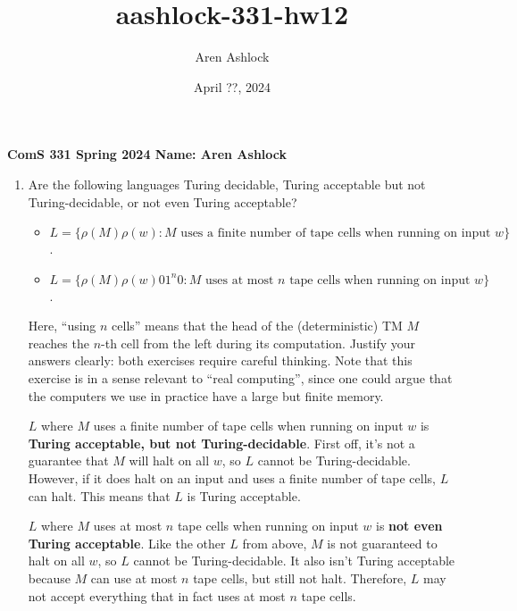 \documentclass[12pt]{article}
\title{aashlock-331-hw12}
\author{Aren Ashlock}
\date{April ??, 2024}
\begin{document}
\noindent\textbf{ComS 331 \quad Spring 2024 \quad Name: Aren Ashlock}

\begin{enumerate}


\item Are the following languages Turing decidable, Turing acceptable but not Turing-decidable, or not even Turing acceptable?

\begin{itemize}
  \item $L = \{\rho(M)\rho(w) : M \text{ uses a finite number of tape cells when running on input } w\}$.
  \item $L = \{\rho(M)\rho(w)01^n0 : M \text{ uses at most } n \text{ tape cells when running on input } w\}$.
\end{itemize}

Here, “using $n$ cells” means that the head of the (deterministic) TM $M$ reaches the $n$-th cell from the left during its computation. Justify your answers clearly: both exercises require careful thinking. Note that this exercise is in a sense relevant to “real computing”, since one could argue that the computers we use in practice have a large but finite memory.

\color{blue}
    $L$ where $M$ uses a finite number of tape cells when running on input $w$ is \textbf{Turing acceptable, but not Turing-decidable}. First off, it's not a guarantee that $M$ will halt on all $w$, so $L$ cannot be Turing-decidable. However, if it does halt on an input and uses a finite number of tape cells, $L$ can halt. This means that $L$ is Turing acceptable.

    $L$ where $M$ uses at most $n$ tape cells when running on input $w$ is \textbf{not even Turing acceptable}. Like the other $L$ from above, $M$ is not guaranteed to halt on all $w$, so $L$ cannot be Turing-decidable. It also isn't Turing acceptable because $M$ can use at most $n$ tape cells, but still not halt. Therefore, $L$ may not accept everything that in fact uses at most $n$ tape cells.
\color{black}


\end{enumerate}
\end{document}

